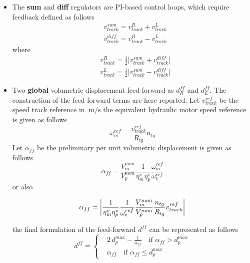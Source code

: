 \documentclass[12pt,a4paper,oneside]{book}
\begin{document}
\begin{onehalfspace}
\begin{itemize}
	\item The \textbf{sum} and \textbf{diff} regulators are PI-based control loops, which require feedback defined as follows
	\begin{equation}
		\begin{aligned}
			& v_{track}^{sum} = v_{track}^{R} + v_{track}^{L} \\[6pt]
			& v_{track}^{diff} = v_{track}^{R} - v_{track}^{L}
		\end{aligned}
	\end{equation}
	where 
	\begin{equation}
		\begin{aligned}
			& v_{track}^{R} = \frac{1}{2}\Big[v_{track}^{sum} + v_{track}^{diff}\Big] \\[6pt]
			& v_{track}^{L} = \frac{1}{2}\Big[v_{track}^{sum} - v_{track}^{diff}\Big]
		\end{aligned}
	\end{equation}
	\item Two \textbf{global} volumetric displacement feed-forward as $d_R^{ff}$ and $d_L^{ff}$. The construction of the feed-forward terms are here reported. Let $v_{track}^{ref}$ be the speed track reference in $\SI{}{\meter\per\second}$ the equivalent hydraulic motor speed reference is given as follows
	\begin{equation}
		\omega_m^{ref} =\frac{v_{track}^{ref}}{R_{tg}}n_{tg}
	\end{equation}
	Let $\alpha_{ff}$ be the preliminary per unit volumetric displacement is given as follows
	\begin{equation}
		\alpha_{ff} =\frac{V_m^{nom}}{V_p^{nom}} \frac{1}{\eta_m^v\eta_p^v} \frac{\omega_m^{ref}}{\omega_e^{ref}}
	\end{equation}
	or also
	\begin{mybox}
		\begin{equation}
			\alpha_{ff} = \abs{\frac{1}{\eta_m^v\eta_p^v}\frac{1}{\omega_e^{ref}}\frac{V_m^{nom}}{V_p^{nom}} \frac{n_{tg}}{R_{tg}}v_{track}^{ref}}
		\end{equation}
	\end{mybox}
	the final formulation of the feed-forward $d^{ff}$ can be represented as follows
	\begin{equation}
		\boxed{d^{ff} = \left\lbrace \begin{aligned}
				& 2\,d_p^{max} - \frac{1}{\alpha_{ff}} \quad\text{if $\alpha_{ff} > d_p^{max}$} \\[6pt]
				& \alpha_{ff}  \quad\text{if $\alpha_{ff} \le d_p^{max}$}
			\end{aligned}\right. }
	\end{equation}
\end{itemize}


\end{onehalfspace}
\end{document}
